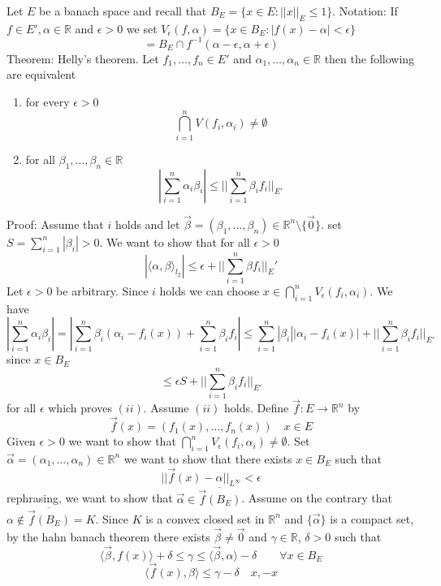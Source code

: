 \documentclass[11pt]{article}
\begin{document}
Let $E$ be a banach space and recall that $B_E = \{ x \in E : ||x||_E \le 1\}$.
Notation: If  $f \in E', \alpha \in \mathbb{R}$ and $\epsilon > 0$ we set $V_\epsilon(f,\alpha) = \{ x \in B_E : | f(x) - \alpha| < \epsilon\}$
\[
 = B_E \cap f^{-1}(\alpha - \epsilon, \alpha + \epsilon)
\] 
Theorem: Helly's theorem. Let $f_1,\dots,f_n \in E'$ and $\alpha_1,\dots,\alpha_n \in \mathbb{R}$
then the following are equivalent
\begin{enumerate}
    \item  for every $\epsilon  > 0$ 
        \[
            \bigcap_{i=1}^{n}V(f_i, \alpha_i) \ne \emptyset
        \] 
    \item for all $\beta_1,\dots,\beta_n \in \mathbb{R}$
        \[
            |\sum_{i=1}^{n}\alpha_i \beta_i | \le || \sum_{i=1}^{n} \beta_i f_i ||_{E'}
        \] 
\end{enumerate}
Proof: Assume that $i$ holds and let $\vec \beta = (\beta_1,\dots,\beta_n) \in \mathbb{R}^{n} \setminus \{\vec 0\}$. 
set $S = \sum_{i=1}^{n} |\beta_i| > 0$.
We want to show that for all $\epsilon > 0$
\[
    | \langle \alpha, \beta \rangle_{l_2}| \le \epsilon + ||\sum_{i=1}^{n} \beta f_i ||_E'
\] 
Let $\epsilon > 0$ be arbitrary. Since $i$ holds we can choose $x \in \bigcap_{i=1}^{n}V_\epsilon(f_i, \alpha_i)$.
We have
\[
    |\sum_{i=1}^{n}\alpha_i \beta_i| = |\sum_{i=1}^{n} \beta_i( \alpha_i - f_i(x)) + \sum_{i=1}^{n} \beta_i f_i| \le \sum_{i=1}^{n} |\beta_i| |\alpha_i - f_i(x)| + || \sum_{i=1}^{n} \beta_i f_i ||_{E'}
\] 
since $x \in B_E$ 
\[
\le \epsilon S + ||\sum_{i=1}^{n} \beta_i f_i ||_{E'}
\] 
for all $\epsilon$ which proves $(ii)$.
Assume  $(ii)$ holds. Define $\vec f : E \to \mathbb{R}^{n}$ by
 \[
\vec f(x) = (f_1(x),\dots,f_n(x)) \quad x \in E
\] 
Given $\epsilon > 0$ we want to show that $\bigcap_{i=1}^{n}V_\epsilon(f_i, \alpha_i) \ne \emptyset $.
Set $\vec \alpha = (\alpha_1,\dots,\alpha_n) \in \mathbb{R}^{n}$ we want to show that there exists
$x \in B_E$ such that
\[
    ||\vec f(x) - \alpha||_{L^{\infty}} < \epsilon
\] 
rephrasing, we want to show that  $\vec \alpha \in \overline{ \vec f (B_E)}$.
Assume on the contrary that $\alpha \not\in \overline{ \vec f(B_E)} = K$. Since $K$ is a convex closed set in $ \mathbb{R}^{n}$ 
and $\{ \vec \alpha\}$ is a compact set, by the hahn banach theorem there exists $\vec \beta \ne \vec 0$ and $\gamma \in \mathbb{R}$, $\delta > 0$ such that
\[
\langle \vec \beta, f(x) \rangle + \delta \le \gamma \le \langle \vec \beta, \alpha \rangle - \delta \qquad \forall x \in B_E
\] 
\[
\langle \vec f(x), \beta \rangle \le \gamma - \delta \quad x , -x
\] 
\end{document}
